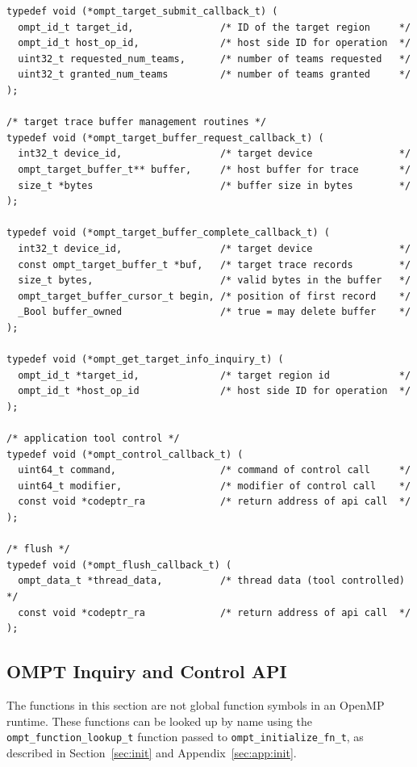 \documentclass{article}
\begin{document}
\begin{verbatim}
typedef void (*ompt_target_submit_callback_t) (
  ompt_id_t target_id,               /* ID of the target region     */
  ompt_id_t host_op_id,              /* host side ID for operation  */
  uint32_t requested_num_teams,      /* number of teams requested   */
  uint32_t granted_num_teams         /* number of teams granted     */
);

/* target trace buffer management routines */
typedef void (*ompt_target_buffer_request_callback_t) (
  int32_t device_id,                 /* target device               */
  ompt_target_buffer_t** buffer,     /* host buffer for trace       */
  size_t *bytes                      /* buffer size in bytes        */
);
  
typedef void (*ompt_target_buffer_complete_callback_t) (
  int32_t device_id,                 /* target device               */
  const ompt_target_buffer_t *buf,   /* target trace records        */
  size_t bytes,                      /* valid bytes in the buffer   */
  ompt_target_buffer_cursor_t begin, /* position of first record    */
  _Bool buffer_owned                 /* true = may delete buffer    */
);

typedef void (*ompt_get_target_info_inquiry_t) (
  ompt_id_t *target_id,              /* target region id            */
  ompt_id_t *host_op_id              /* host side ID for operation  */
);

/* application tool control */
typedef void (*ompt_control_callback_t) (
  uint64_t command,                  /* command of control call     */
  uint64_t modifier,                 /* modifier of control call    */
  const void *codeptr_ra             /* return address of api call  */
);

/* flush */
typedef void (*ompt_flush_callback_t) (
  ompt_data_t *thread_data,          /* thread data (tool controlled) */
  const void *codeptr_ra             /* return address of api call  */
);

\end{verbatim}


\clearpage
\subsection{OMPT Inquiry and Control API}

The functions in this section are not global function symbols in an OpenMP runtime. These functions can be looked up by name using the \verb|ompt_function_lookup_t| function passed to \verb|ompt_initialize_fn_t|, as described in Section~\ref{sec:init} and Appendix~\ref{sec:app:init}.
\end{document}
